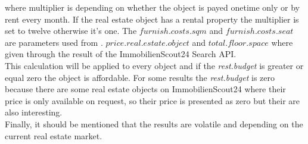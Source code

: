 where multiplier is depending on whether the object is payed onetime only or by rent every month. If the real estate
 object has a rental property the multiplier is set to twelve otherwise it's one. The $furnish.costs.sqm$ and
 $furnish.costs.seat$ are parameters used from \cite{BenchmarkGastronomie}. $price.real.estate.object$ and
 $total.floor.space$ where given through the result of the ImmobilienScout24 Search \ac{API}. \\
 This calculation will be applied to
 every object and if the \textit{rest.budget} is greater or equal zero the object is affordable. For some results the
 \textit{rest.budget} is zero because there are some real estate objects on ImmobilienScout24 where their
 price is only available on request, so their price is presented as zero but their are also interesting. \\

Finally, it should be mentioned that the results are volatile and depending on the current real estate market.



